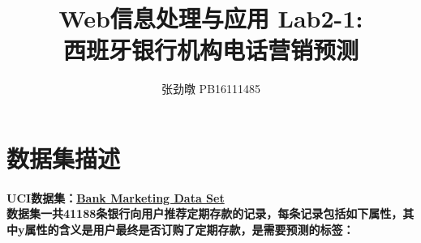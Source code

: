 \documentclass{ctexart}
\title{
    \LARGE
    Web信息处理与应用 Lab2-1: \\
    西班牙银行机构电话营销预测  \\[280pt]
}
\author{
    张劲暾  PB16111485 
}
\begin{document}
    \maketitle
    \newpage
    \tableofcontents
    \section{数据集描述}
    \paragraph{
        UCI数据集：\href{https://archive.ics.uci.edu/ml/datasets/Bank+Marketing}{Bank Marketing Data Set }\\
        数据集一共41188条银行向用户推荐定期存款的记录，每条记录包括如下属性，其中y属性的含义是用户最终是否订购了定期存款，是需要预测的标签：
    }
\end{document}
